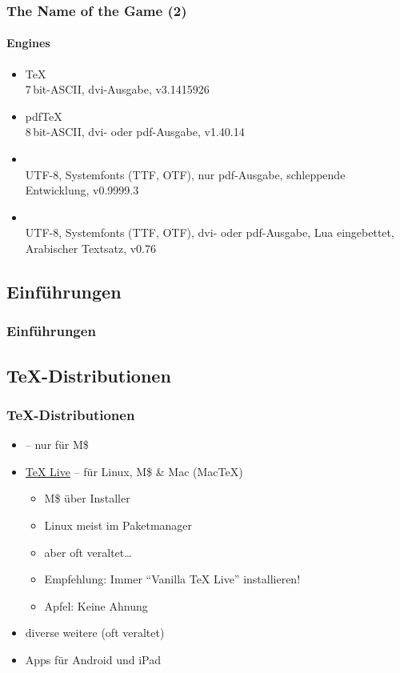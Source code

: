 \documentclass[t,ngerman]{beamer}
\begin{document}
\begin{frame}
  \frametitle{The Name of the Game (2)}
  \framesubtitle{Engines}
  \begin{itemize}
  \item \TeX\\
    7\,bit-ASCII, dvi-Ausgabe, v3.1415926
  \item pdf\TeX\\
    8\,bit-ASCII, dvi- oder pdf-Ausgabe, v1.40.14
  \item {}\\
    UTF-8, Systemfonts (TTF, OTF), nur pdf-Ausgabe, schleppende
    Entwicklung, v0.9999.3
  \item {}\\
    UTF-8, Systemfonts (TTF, OTF), dvi- oder pdf-Ausgabe, Lua
    eingebettet, Arabischer Textsatz, v0.76
  \end{itemize}
\end{frame}

\subsection{Einf\"uhrungen}

\begin{frame}
  \frametitle{Einführungen}
  \nocite{*}
  \begingroup
  \printbibliography[heading=none]
  \endgroup
\end{frame}

\subsection{\TeX-Distributionen}

\begin{frame}
  \frametitle{\TeX-Distributionen}
  \begin{itemize}
  \item \href{http://miktex.org}{} – nur für M\$
  \item \href{http://tug.org/texlive}{\TeX{} Live} – für Linux, M\$ \&
    Mac (Mac\TeX)
    \begin{itemize}
    \item M\$ über Installer
    \item Linux meist im Paketmanager
    \item \alert{aber} oft veraltet\dots
    \item Empfehlung: Immer \enquote{Vanilla \TeX{} Live}
      installieren!
    \item Apfel: Keine Ahnung
    \end{itemize}
  \item diverse weitere (oft veraltet)
  \item Apps für Android und iPad
  \end{itemize}
\end{frame}
\end{document}

